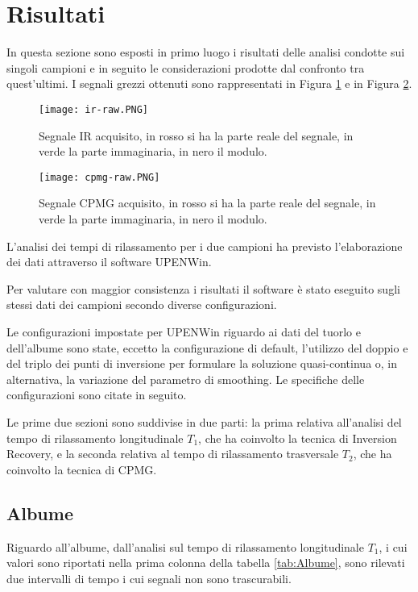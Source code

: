 \section*{Risultati}
In questa sezione sono esposti in primo luogo i risultati delle analisi condotte sui singoli campioni e in seguito le considerazioni prodotte dal confronto tra quest'ultimi. I segnali grezzi ottenuti sono rappresentati in Figura \ref{fig:ir-raw} e in Figura \ref{fig:cpmg-raw}.

\begin{figure}[ht]
\texttt{[image: ir-raw.PNG]}
\caption{Segnale IR acquisito, in rosso si ha la parte reale del segnale, in verde la parte immaginaria, in nero il modulo.}
\label{fig:ir-raw}
\end{figure}
\begin{figure}[ht]
\texttt{[image: cpmg-raw.PNG]}
\caption{Segnale CPMG acquisito, in rosso si ha la parte reale del segnale, in verde la parte immaginaria, in nero il modulo.}
\label{fig:cpmg-raw}
\end{figure} 

L'analisi dei tempi di rilassamento per i due campioni ha previsto l'elaborazione dei dati attraverso il software UPENWin.

Per valutare con maggior consistenza i risultati il software è stato eseguito sugli stessi dati dei campioni secondo diverse configurazioni.

Le configurazioni impostate per UPENWin riguardo ai dati del tuorlo e dell'albume sono state, eccetto la configurazione di default, l'utilizzo del doppio e del triplo dei punti di inversione per formulare la soluzione quasi-continua o, in alternativa, la variazione del parametro di smoothing. 
Le specifiche delle configurazioni sono citate in seguito. 

Le prime due sezioni sono suddivise in due parti: la prima relativa all'analisi del tempo di rilassamento longitudinale $T_1$, che ha coinvolto la tecnica di Inversion Recovery, e la seconda relativa al tempo di rilassamento trasversale $T_2$, che ha coinvolto la tecnica di CPMG. 



\subsection*{Albume} 

Riguardo all'albume, dall'analisi sul tempo di rilassamento longitudinale $T_1$, i cui valori sono riportati nella prima colonna della tabella \ref{tab:Albume}, sono rilevati due intervalli di tempo i cui segnali non sono trascurabili. 

